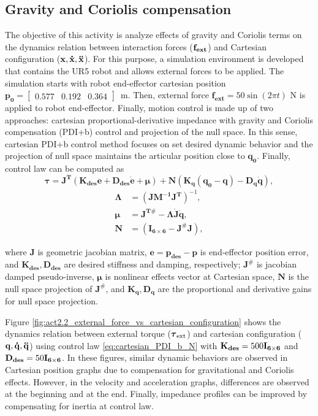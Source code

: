 \graphicspath{{images/act_2.2/}}
\subsection{Gravity and Coriolis compensation}
The objective of this activity is analyze effects of gravity and Coriolis terms on the dynamics relation between interaction forces ($\mathbf{f_{ext}}$) and Cartesian configuration ($\mathbf{x, \dot{x}, \ddot{x}}$). For this purpose, a simulation environment is developed that contains the UR5 robot and allows external forces to be applied. The simulation starts with robot end-effector cartesian position $\mathbf{p_0}=\begin{bmatrix}  0.577 &   0.192 &   0.364 \end{bmatrix}$~m. Then, external force $\mathbf{f_{ext}}= 50\sin{(2\pi t)}$ N is applied to robot end-effector. Finally, motion control is made up of two approaches: cartesian proportional-derivative impedance with gravity and Coriolis compensation (PDI+b) control and projection of the null space. In this sense, cartesian PDI+b control method focuses on set desired dynamic behavior and the projection of null space maintains the articular position close to $\mathbf{q_0}$. Finally, control law can be computed as 
\begin{equation}
	\boldsymbol{\tau}
	= \mathbf{J^T} (\mathbf{K_{des} e} + \mathbf{D_{des} \dot{e}} + \boldsymbol{\mu}) + \mathbf{N} \left(\mathbf{K_q(q_0-q) - D_q \dot{q}} \right),
	\label{eq:cartesian_PDI_b_N}
\end{equation}
\begin{align*}
	\boldsymbol{\Lambda} &= (\mathbf{J M^{-1} J^{T}})^{-1}, \\
	\boldsymbol{\mu} &= \mathbf{J^{T\#}} - \boldsymbol{\Lambda}\mathbf{\dot{J}\dot{q}}, \\
	\mathbf{N} &=(\mathbf{I_{6 \times 6}} - \mathbf{J^{\#} J} ),
\end{align*}

\noindent where $\mathbf{J}$ is geometric jacobian matrix, $\mathbf{e}=\mathbf{p_{des} - p}$ is end-effector position error, and $\mathbf{K_{des}, D_{des}}$ are desired stiffness and damping, respectively; $\mathbf{J^{\#}}$ is jacobian damped pseudo-inverse, $\boldsymbol{\mu}$ is nonlinear effects vector at Cartesian space, $\mathbf{N}$ is the null space projection of $\mathbf{J^{\#}}$, and $\mathbf{K_q, D_q}$ are the proportional and derivative gains for null space projection. 

Figure \ref{fig:act2.2_external_force_vs_cartesian_configuration} shows the dynamics relation between external torque ($\boldsymbol{\tau}_\mathrm{ext}$) and cartesian configuration ($\mathbf{q, \dot{q}, \ddot{q}}$) using control law \eqref{eq:cartesian_PDI_b_N} with $\mathbf{K_{des}}=500\mathbf{I_{6 \times 6}}$ and $\mathbf{D_{des}}=50\mathbf{I_{6 \times 6}}$. In these figures, similar dynamic behaviors are observed in Cartesian position graphs due to compensation for gravitational and Coriolis effects. However, in the velocity and acceleration graphs, differences are observed at the beginning and at the end. Finally, impedance profiles can be improved by compensating for inertia at control law.

